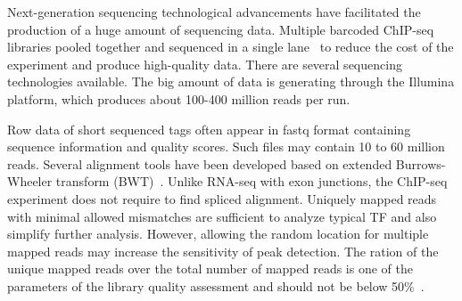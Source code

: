 Next-generation sequencing technological advancements have facilitated the production of a huge amount of sequencing data. 
Multiple barcoded ChIP-seq libraries pooled together and sequenced in a single lane~\cite{craig2008identification} to reduce the cost of the experiment and produce high-quality data.
There are several sequencing technologies available. The big amount of data is generating through the Illumina platform, which produces about 100-400 million reads per run.

Row data of short sequenced tags often appear in fastq format containing sequence information and quality scores. Such files may contain 10 to 60 million reads. Several alignment tools have been developed based on extended Burrows-Wheeler transform (BWT)~\cite{li2009fast, siren2014indexing}.
Unlike RNA-seq with exon junctions, the ChIP-seq experiment does not require to find spliced alignment. 
Uniquely mapped reads with minimal allowed mismatches are sufficient to analyze typical TF and also simplify further analysis. 
However, allowing the random location for multiple mapped reads may increase the sensitivity of peak detection. 
The ration of the unique mapped reads over the total number of mapped reads is one of the parameters of the library quality assessment and should not be below 50\%~\cite{shin2013computational}.
